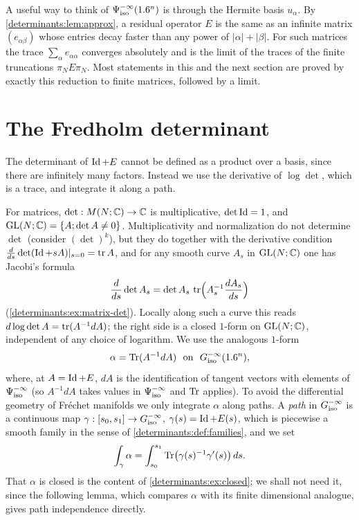 \begin{discussion}
A useful way to think of $\Psi^{-\infty}_{\mathrm{iso}}(1.6^n)$ is through the Hermite
basis $u_\alpha$. By \cref{determinants:lem:approx}, a residual operator $E$
is the same as an infinite matrix $(e_{\alpha\beta})$ whose entries decay
faster than any power of $|\alpha|+|\beta|$. For such matrices the trace
$\sum_\alpha e_{\alpha\alpha}$ converges absolutely and is the limit of the
traces of the finite truncations $\pi_NE\pi_N$. Most statements in this and
the next section are proved by exactly this reduction to finite matrices,
followed by a limit.
\end{discussion}

\section{The Fredholm determinant}\label{determinants:sec:determinant}

The determinant of $\operatorname{Id}+E$ cannot be defined as a product over a basis,
since there are infinitely many factors. Instead we use the derivative of
$\log\det$, which is a trace, and integrate it along a path.

For matrices, $\det:M(N;\mathbb{C})\to\mathbb{C}$ is multiplicative, $\det\operatorname{Id}=1$, and
$\operatorname{GL}(N;\mathbb{C})=\{A;\det A\ne0\}$. Multiplicativity and normalization do not
determine $\det$ (consider $(\det)^k$), but they do together with the
derivative condition $\frac{d}{ds}\det(\operatorname{Id}+sA)|_{s=0}=\operatorname{tr} A$, and for any
smooth curve $A_s$ in $\operatorname{GL}(N;\mathbb{C})$ one has Jacobi's formula
\begin{equation}\label{determinants:eq:jacobi}
  \frac{d}{ds}\det A_s=\det A_s\,\operatorname{tr}\Bigl(A_s^{-1}\frac{dA_s}{ds}\Bigr)
\end{equation}
(\cref{determinants:ex:matrix-det}). Locally along such a curve this reads
$d\log\det A=\operatorname{tr}(A^{-1}dA)$; the right side is a closed $1$-form on
$\operatorname{GL}(N;\mathbb{C})$, independent of any choice of logarithm. We use the analogous
$1$-form
\begin{equation*}
  \alpha=\Tr(A^{-1}dA)\ \text{ on }\ \Giso{-\infty}(\R^n),
\end{equation*}
where, at $A=\operatorname{Id}+E$, $dA$ is the identification of tangent vectors with
elements of $\Psi^{-\infty}_{\mathrm{iso}}$ (so $A^{-1}dA$ takes values in
$\Psi^{-\infty}_{\mathrm{iso}}$ and $\operatorname{Tr}$ applies). To avoid the differential geometry of
Fr\'echet manifolds we only integrate $\alpha$ along paths. A
\emph{path} in $G^{-\infty}_{\mathrm{iso}}$ is a continuous map
$\gamma:[s_0,s_1]\to G^{-\infty}_{\mathrm{iso}}$, $\gamma(s)=\operatorname{Id}+E(s)$, which is
piecewise a smooth family in the sense of
\cref{determinants:def:families}, and we set
\begin{equation*}
  \int_\gamma\alpha=\int_{s_0}^{s_1}\operatorname{Tr}\bigl(\gamma(s)^{-1}\gamma'(s)\bigr)\,ds .
\end{equation*}
That $\alpha$ is closed is the content of \cref{determinants:ex:closed}; we
shall not need it, since the following lemma, which compares $\alpha$ with its
finite dimensional analogue, gives path independence directly.

